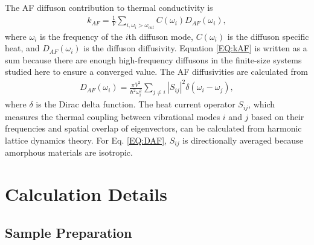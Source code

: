 \documentclass[aps,prb,onecolumn,preprint,superscriptaddress,footinbib,amsmath,amssymb,floatfix]{revtex4}
\begin{document}
The AF diffuson contribution to thermal conductivity is
\cite{feldman_thermal_1993,feldman_numerical_1999}
\begin{equation}\label{EQ:kAF}
\begin{split}
k_{AF} = \frac{1}{V}\sum_{i,\omega_i>\omega_{cut}} 
C(\omega_i) D_{AF}(\omega_i), 
\end{split}
\end{equation}
where $\omega_i$ is the frequency of the $i$th diffuson mode, 
$C(\omega_i)$ is the diffuson specific heat, and $D_{AF}(\omega_i)$ 
is the diffuson diffusivity. Equation \eqref{EQ:kAF} is written as a 
sum because there are enough high-frequency diffusons in the 
finite-size systems studied here to ensure a converged 
value.\cite{feldman_thermal_1993,feldman_numerical_1999} 
The AF diffusivities are calculated from\cite{allen_thermal_1993} 
\begin{equation}\label{EQ:DAF}
\begin{split}
D_{AF}(\omega_i) = \frac{\pi V^2}{\hbar^2\omega^2_i}\sum_{j\neq i}
|S_{ij}|^2 \delta(\omega_i - \omega_j),
\end{split}
\end{equation}
where $\delta$ is the Dirac delta 
function.\cite{mfp_fn1} 
The heat current operator $S_{ij}$, which measures the thermal coupling 
between vibrational modes $i$ and $j$ based on their frequencies and 
spatial overlap of eigenvectors, 
can be calculated from harmonic lattice dynamics theory.
\cite{allen_thermal_1993,feldman_thermal_1993,feldman_numerical_1999} 
For Eq. \eqref{EQ:DAF}, $S_{ij}$ is directionally averaged because 
amorphous materials are isotropic. 

\section{\label{S:Calculation}Calculation Details}

\subsection{\label{S:Sample}Sample Preparation}
\end{document}

